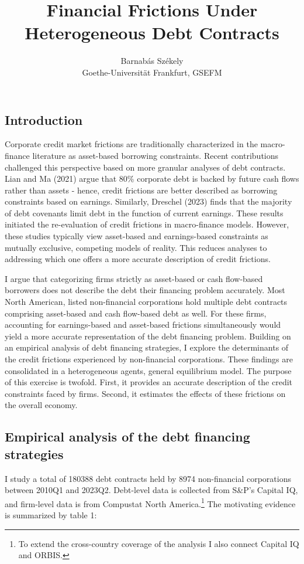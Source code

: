 \documentclass[12pt]{article}
\title{Financial Frictions Under Heterogeneous Debt Contracts}
\author{Barnabás Székely \\ \small  Goethe-Universität Frankfurt, GSEFM}
\date{}
\begin{document}
\maketitle

\subsection*{Introduction} \label{sec:introduction}

Corporate credit market frictions are traditionally characterized in the macro-finance literature as asset-based borrowing constraints. Recent contributions challenged this perspective based on more granular analyses of debt contracts. Lian and Ma (2021) argue that 80\% corporate debt is backed by future cash flows rather than assets - hence, credit frictions are better described as borrowing constraints based on earnings. Similarly, Dreschel (2023) finds that the majority of debt covenants limit debt in the function of current earnings. These results initiated the re-evaluation of credit frictions in macro-finance models. However, these studies typically view asset-based and earnings-based constraints as mutually exclusive, competing models of reality. This reduces analyses to addressing which one offers a more accurate description of credit frictions.  

I argue that categorizing firms strictly as asset-based or cash flow-based borrowers does not describe the debt their financing problem accurately. Most North American, listed non-financial corporations hold multiple debt contracts comprising asset-based and cash flow-based debt as well. For these firms, accounting for earnings-based and asset-based frictions simultaneously would yield a more accurate representation of the debt financing problem. Building on an empirical analysis of debt financing strategies, I explore the determinants of the credit frictions experienced by non-financial corporations. These findings are consolidated in a heterogeneous agents, general equilibrium model. The purpose of this exercise is twofold. First, it provides an accurate description of the credit constraints faced by firms. Second, it estimates the effects of these frictions on the overall economy. 

\subsection*{Empirical analysis of the debt financing strategies}
I study a total of 180388 debt contracts held by 8974 non-financial corporations between 2010Q1 and 2023Q2. Debt-level data is collected from S\&P's Capital IQ, and firm-level data is from Compustat North America.\footnote{To extend the cross-country coverage of the analysis I also connect Capital IQ and ORBIS.} The motivating evidence is summarized by table 1: 
\end{document}
